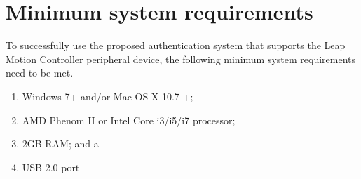 
\chapter{Minimum system requirements}

To successfully use the proposed authentication system that supports the Leap Motion Controller peripheral device, the following minimum system requirements need to be met. 

\begin{enumerate}[label=\roman*.]
    \item Windows 7+ and/or Mac OS X 10.7 +;
    \item AMD Phenom II or Intel Core i3/i5/i7 processor;
    \item 2GB RAM; and a
    \item USB 2.0 port
\end{enumerate}
    
